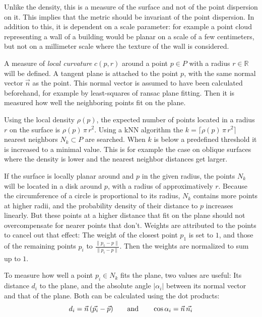 Unlike the density, this is a measure of the surface and not of the point dispersion on it. This implies that the metric should be invariant of the point dispersion. In addition to this, it is dependent on a scale parameter: for example a point cloud representing a wall of a building would be planar on a scale of a few centimeters, but not on a millimeter scale where the texture of the wall is considered.

A measure of \emph{local curvature} $c(p, r)$ around a point $p \in P$ with a radius $r \in \mathbb{R}$ will be defined. A tangent plane is attached to the point $p$, with the same normal vector $\vec{n}$ as the point. This normal vector is assumed to have been calculated beforehand, for example by least-squares of \gls{ransac} plane fitting. Then it is measured how well the neighboring points fit on the plane.

Using the local density $\rho(p)$, the expected number of points located in a radius $r$ on the surface is $\rho(p) \, \pi \, r^2$. Using a kNN algorithm the $k = \lceil \rho(p) \, \pi \, r^2 \rceil$ nearest neighbors $N_k \subset P$ are searched. When $k$ is below a predefined threshold it is increased to a minimal value. This is for example the case on oblique surfaces where the density is lower and the nearest neighbor distances get larger.

If the surface is locally planar around and $p$ in the given radius, the points $N_k$ will be located in a disk around $p$, with a radius of approximatively $r$. Because the circumference of a circle is proportional to its radius, $N_k$ contains more points at higher radii, and the probability density of their distance to $p$ increases linearly. But these points at a higher distance that fit on the plane should not overcompensate for nearer points that don't. Weights are attributed to the points to cancel out that effect: The weight of the closest point $p_1$ is set to $1$, and those of the remaining points $p_i$ to $\frac{\| p_1 - p \|}{\| p_i - p \|}$. Then the weights are normalized to sum up to $1$.

To measure how well a point $p_i \in N_k$ fits the plane, two values are useful: Its distance $d_i$ to the plane, and the absolute angle $|\alpha_i|$ between its normal vector and that of the plane. Both can be calculated using the dot products:
\begin{equation}
d_i = \vec{n} \, (\vec{p_i} - \vec{p})
\hspace{7mm} \text{and} \hspace{7mm}
\cos \alpha_i = \vec{n} \, \vec{n_i}
\end{equation} 

